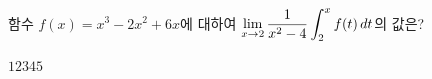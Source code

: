 함수 $f(x)=x^3-2x^2+6x$에 대하여 $\displaystyle\lim_{x\to 2}\dfrac{1}{x^2-4}\int_{2}^{x}f(t)\mkern3mu dt$의 값은?
\begin{choices32}{$1$}{$2$}{$3$}{$4$}{$5$}\end{choices32}
